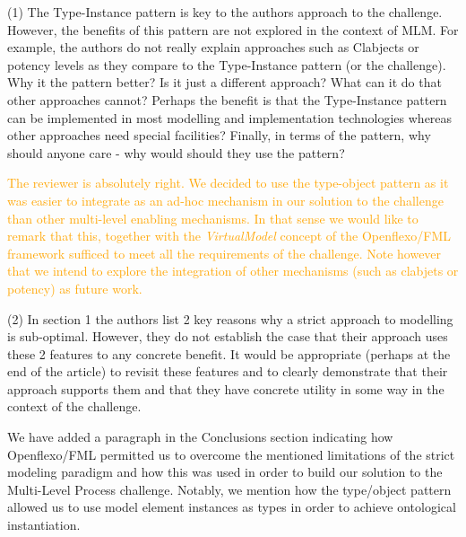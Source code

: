 \documentclass[10pt]{article}
\begin{document}
\pagebreak


\begin{response}{(1) The Type-Instance pattern is key to the authors approach to the challenge. However, the benefits of this pattern are not explored in the context of MLM. For example, the authors do not really explain approaches such as Clabjects or potency levels as they compare to the Type-Instance pattern (or the challenge). Why it the pattern better? Is it just a different approach? What can it do that other approaches cannot? Perhaps the benefit is that the Type-Instance pattern can be implemented in most modelling and implementation technologies whereas other approaches need special facilities? Finally, in terms of the pattern, why should anyone care - why would should they use the pattern?} 

\textcolor{orange}{The reviewer is absolutely right. We decided to use the type-object pattern as it was easier to integrate as an ad-hoc mechanism in our solution to the challenge than other multi-level enabling mechanisms. In that sense we would like to remark that this, together with the \emph{VirtualModel} concept of the Openflexo/FML framework sufficed to meet all the requirements of the challenge. Note however that we intend to explore the integration of other mechanisms (such as clabjets or potency) as future work.}

\end{response}

\begin{response}{(2) In section 1 the authors list 2 key reasons why a strict approach to modelling is sub-optimal. However, they do not establish the case that their approach uses these 2 features to any concrete benefit. It would be appropriate (perhaps at the end of the article) to revisit these features and to clearly demonstrate that their approach supports them and that they have concrete utility in some way in the context of the challenge.} 

We have added a paragraph in the Conclusions section indicating how Openflexo/FML permitted us to overcome the mentioned limitations of the strict modeling paradigm and how this was used in order to build our solution to the Multi-Level Process challenge. Notably, we mention how the type/object pattern allowed us to use model element instances as types in order to achieve ontological instantiation.
\end{response}
\end{document}
